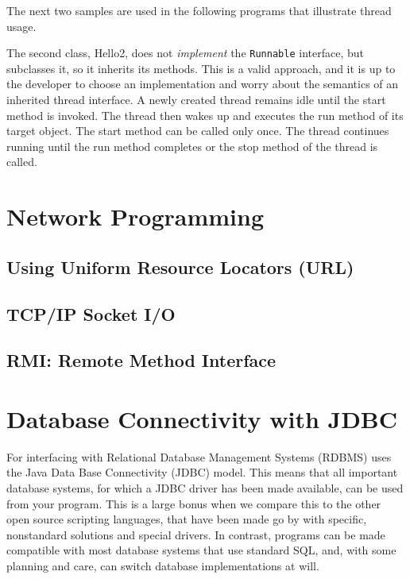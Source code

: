 {The next two samples are used in the following programs that
illustrate thread usage.
 
 
The second class, Hello2, does not \emph{implement} the
\texttt{Runnable} interface, but subclasses it, so it inherits its
methods. This is a valid approach, and it is up to the developer to
choose an implementation and worry about the semantics of an inherited
thread interface.
A newly created thread remains idle until the start method is invoked. The thread then wakes up and executes the run method of its target object. The start method can be called only once. The thread continues running until the run method completes or the stop method of the thread is called.



\chapter{Network Programming}
\section{Using Uniform Resource Locators (URL)}
\section{TCP/IP Socket I/O}
\section{RMI: Remote Method Interface}

\chapter{Database Connectivity with JDBC}
For interfacing with Relational Database Management Systems (RDBMS)
\nr{} uses the Java Data Base Connectivity (JDBC) model. This means
that all important database systems, for which a JDBC driver has
been made available, can be used from your \nr{} program. This is a
large bonus when we compare this to the other open source scripting
languages, that have been made go by with specific, nonstandard
solutions and special drivers. In contrast, \nr{} programs can be
made compatible with most database systems that use standard SQL, and,
with some planning and care, can switch database implementations at
will.
 

}
